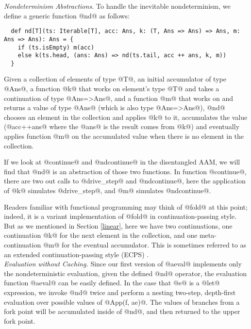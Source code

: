 \documentclass[acmsmall, review]{acmart}\settopmatter{}
\begin{document}
\textit{Nondeterminism Abstractions.}
To handle the inevitable nondeterminism, we define a generic function @nd@ as follows:

\begin{lstlisting}
  def nd[T](ts: Iterable[T], acc: Ans, k: (T, Ans => Ans) => Ans, m: Ans => Ans): Ans = {
    if (ts.isEmpty) m(acc)
    else k(ts.head, (ans: Ans) => nd(ts.tail, acc ++ ans, k, m))
  }
\end{lstlisting}

Given a collection of elements of type @T@, an initial accumulator of type 
@Ans@, a function @k@ that works on element's type @T@ and takes a continuation 
of type @Ans=>Ans@, and a function @m@ that works on and returns a value of type 
@Ans@ (which is also type @Ans=>Ans@), @nd@ chooses an element in the collection 
and applies @k@ to it, accumulates the value (@acc++ans@ where the @ans@ is the 
result comes from @k@) and eventually applies function @m@ on the accumulated 
value when there is no element in the collection.

If we look at @continue@ and @ndcontinue@ in the disentangled AAM, we will find
that @nd@ is an abstraction of those two functions. In function @continue@,
there are two out calls to @drive_step@ and @ndcontinue@, here the application
of @k@ simulates @drive_step@, and @m@ simulates @ndcontinue@.

Readers familiar with functional programming may think of @fold@ at this point; indeed,
it is a variant implementation of @fold@ in continuation-passing style. But as we mentioned 
in Section \ref{linear}, here we have two continuations, one continuation @k@ for the next 
element in the collection, and one meta-continuation @m@ for the eventual accumulator.
This is sometimes referred to as an extended continuation-passing style (ECPS) \cite{Danvy:1990:AC:91556.91622}. \\

\textit{Evaluation without Caching.}
Since our first version of @aeval@ implements only the nondeterministic evaluation, 
given the defined @nd@ operator, the evaluation function @aeval@ can be easily defined. 
In the case that @e@ is a @let@ expression, we invoke @nd@ twice and perform a nesting 
two-step, depth-first evaluation over possible values of @App(f, ae)@.
The values of branches from a fork point will be accumulated inside of @nd@, and 
then returned to the upper fork point.
\end{document}
